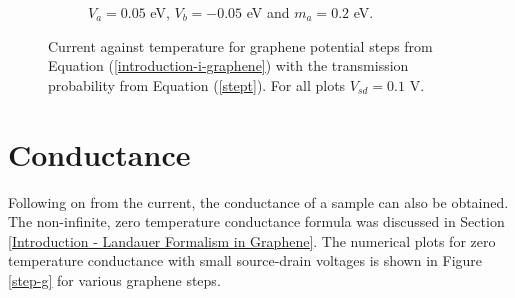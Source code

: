 \begin{figure}[h]
\begin{subfigure}[h]{0.3\textwidth}
				\caption{$V_{a}=0.05$ eV, $V_{b}=-0.05$ eV and $m_{a}=0.2$ eV.}
			\end{subfigure}
			\caption{Current against temperature for graphene potential steps from Equation (\ref{introduction-i-graphene}) with the transmission probability from Equation (\ref{stept}). For all plots $V_{sd}=0.1$ V.}
			\label{step-it}
		\end{figure}
		\section{Conductance}
		\label{Potential Step - Conductance}
			Following on from the current, the conductance of a sample can also be obtained. The non-infinite, zero temperature conductance formula was discussed in Section \ref{Introduction - Landauer Formalism in Graphene}. The numerical plots for zero temperature conductance with small source-drain voltages is shown in Figure \ref{step-g} for various graphene steps.
				
